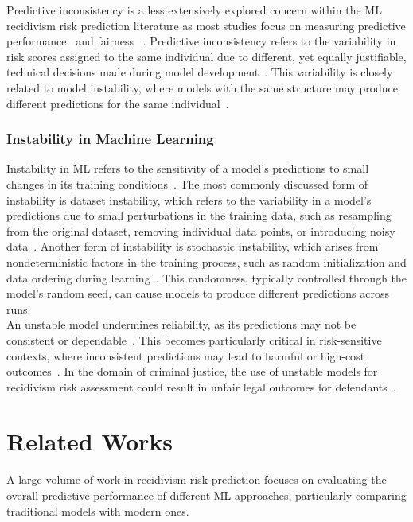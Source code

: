 \documentclass[12pt]{article}
\begin{document}
Predictive inconsistency is a less extensively explored concern within the ML recidivism risk prediction literature as most studies focus on measuring predictive performance~\cite{duwe2017out, travaini2022machine, tollenaar2013method} and fairness~\cite{ tolan2019machine, dressel2018accuracy,ngo2018traditional} . Predictive inconsistency refers to the variability in risk scores assigned to the same individual due to different, yet equally justifiable, technical decisions made during model development~\cite{greene2022forks}. This variability is closely related to model instability, where models with the same structure may produce different predictions for the same individual~\cite{greene2022forks}.

\subsubsection{Instability in Machine Learning}
\tab Instability in ML refers to the sensitivity of a model's predictions to small changes in its training conditions~\cite{sun2015stability}. The most commonly discussed form of instability is dataset instability, which refers to the variability in a model's predictions due to small perturbations in the training data, such as resampling from the original dataset, removing individual data points, or introducing noisy data~\cite{riley2023stability,hardt2016train}. Another form of instability is stochastic instability, which arises from nondeterministic factors in the training process, such as random initialization and data ordering during learning~\cite{lopez2022instability}. This randomness, typically controlled through the model's random seed, can cause models to produce different predictions across runs.\\

An unstable model undermines reliability, as its predictions may not be consistent or dependable~\cite{riley2023stability}. This becomes particularly critical in risk-sensitive contexts, where inconsistent predictions may lead to harmful or high-cost outcomes~\cite{zhang2024reliability}. In the domain of criminal justice, the use of unstable models for recidivism risk assessment could result in unfair legal outcomes for defendants~\cite{greene2022forks}.


\section{Related Works}
\tab A large volume of work in recidivism risk prediction focuses on evaluating the overall predictive performance of different ML approaches, particularly comparing traditional models with modern ones.\\
\end{document}
